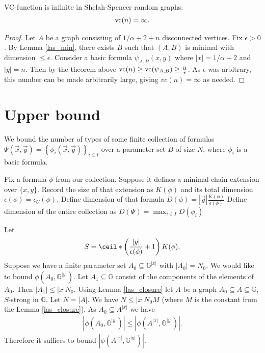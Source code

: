 \documentclass{amsart}
\newcommand{\GG}{\mathbb G}
\newcommand{\GGY}{\GG^{|y|}}
\newcommand{\AX}{A^{|x|}}
\newcommand{\curly}[1]{\left\{#1\right\}}
\newcommand{\paren}[1]{\left(#1\right)}
\newcommand{\abs}[1]{\left|#1\right|}
\begin{document}
\begin{Corollary}
  VC-function is infinite in Shelah-Spencer random graphs:
  \begin{align*}
    \operatorname{vc}(n) = \infty.
  \end{align*}
\end{Corollary}

\begin{proof}
  Let $A$ be a graph consisting of $1/\alpha + 2 + n$ disconnected vertices.
  Fix $\epsilon > 0$.
  By Lemma \ref{las_min}, there exists $B$ such that $(A, B)$ is minimal with dimension $\leq \epsilon$.
  Consider a basic formula $\psi_{A, B}(x, y)$ where $|x| = 1/\alpha + 2$ and $|y| = n$.
  Then by the theorem above $\operatorname{vc}(n) \geq \operatorname{vc} (\psi_{A,B}) \geq \frac{n}{\epsilon}$.
  As $\epsilon$ was arbitrary, this number can be made arbitrarily large, giving $vc(n) = \infty$ as needed.
\end{proof}



\section{Upper bound}

We bound the number of types of some finite collection of formulas $\Psi(\vec x, \vec y) = \curly{\phi_i(\vec x, \vec y)}_{i\in I}$ over a parameter set $B$ of size $N$,
where $\phi_i$ is a basic formula.

Fix a formula $\phi$ from our collection.
Suppose it defines a minimal chain extension over $\{x, y\}$. 
Record the size of that extension as $K(\phi)$ and its total dimension $\epsilon(\phi) = \epsilon_U(\phi)$.
Define dimension of that formula $D(\phi) = |\vec y| \frac{K(\phi)}{\epsilon(\phi)}$
Define dimension of the entire collection as $D(\Psi) = \max_{i \in I} D(\phi_i)$

Let
\begin{align*}
  S = \ceil*{\paren{\frac{|y|}{\epsilon(\phi)} + 1} K(\phi)}.
\end{align*}
Suppose we have a finite parameter set $A_0 \subseteq \GG^{|x|}$ with $|A_0| = N_0$.
We would like to bound $\phi(A_0, \GGY)$.
Let $A_1 \subseteq \GG$ consist of the components of the elements of $A_0$.
Then $|A_1| \leq |x| N_0$.
Using Lemma \ref{las_closure} let $A$ be a graph $A_0 \subseteq A \subseteq \GG$, $S$-strong in $\GG$.
Let $N = |A|$.
We have $N \leq |x| N_0 M$ (where $M$ is the constant from the Lemma \ref{las_closure}).
As $A_0 \subseteq \AX$ we have
\begin{align*}
  \abs{\phi(A_0, \GGY)} \leq \abs{\phi(\AX, \GGY)}.
\end{align*}
Therefore it suffices to bound $\abs{\phi(\AX, \GGY)}$.
\end{document}

